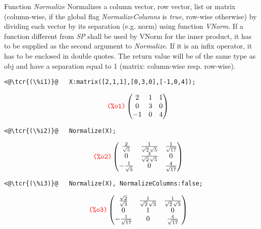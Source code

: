 \documentclass[../Maxima_Workbook.tex]{subfiles}
\begin{document}
\lz Function \emph{Normalize} Normalizes a column vector, row vector, list or matrix (column-wise, 
if the global flag \emph{NormalizeColumns} is \emph{true}, row-wise otherwise) by dividing each vector by its separation (e.g. norm) using function \emph{VNorm}. If a function different from \emph{SP} shall be used by VNorm for the inner product, it has to be supplied as the second argument to \emph{Normalize}. If it is an infix operator, it has to be enclosed in double quotes. The return value will be of the same type as obj and have a separation equal to 1 (matrix: column-wise resp. row-wise). 

\begin{small}
\color{blue}
\begin{lstlisting}
<@\tcr{(\%i1)}@   X:matrix([2,1,1],[0,3,0],[-1,0,4]);
\end{lstlisting}
\vspace{-6mm} \[\tag*{\tcr{\ttfamily (\%o1)}} \begin{pmatrix} 2 & 1 & 1 \\
0 & 3 & 0 \\
-1 & 0 & 4 \end{pmatrix} \]
\vspace{-6mm} \begin{lstlisting}
<@\tcr{(\%i2)}@   Normalize(X);
\end{lstlisting}
\vspace{-6mm} \[\tag*{\tcr{\ttfamily (\%o2)}} \begin{pmatrix}\frac{2}{\sqrt{5}} & \frac{1}{\sqrt{2}\, \sqrt{5}} & \frac{1}{\sqrt{17}}\\
0 & \frac{3}{\sqrt{2}\, \sqrt{5}} & 0\\
-\frac{1}{\sqrt{5}} & 0 & \frac{4}{\sqrt{17}}\end{pmatrix} \]
\vspace{-6mm} \begin{lstlisting}
<@\tcr{(\%i3)}@   Normalize(X), NormalizeColumns:false;
\end{lstlisting}
\vspace{-4mm} \[\tag*{\tcr{\ttfamily (\%o3)}} \begin{pmatrix}\frac{\sqrt{2}}{\sqrt{3}} & \frac{1}{\sqrt{2}\, \sqrt{3}} & \frac{1}{\sqrt{2}\, \sqrt{3}}\\
0 & 1 & 0\\
-\frac{1}{\sqrt{17}} & 0 & \frac{4}{\sqrt{17}}\end{pmatrix} \]
\color{black}
\end{small}

 \hfill {} \\
 \hfill {}
\end{document}
